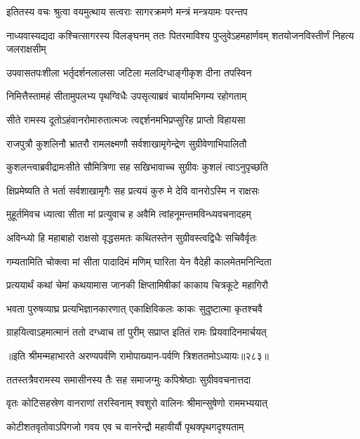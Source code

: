 \twolineshloka
{इतितस्य वचः श्रुत्वा वयमुत्थाय सत्वराः}
{सागरक्रमणे मन्त्रं मन्त्रयामः परन्तप}


\threelineshloka
{नाध्यवास्यद्यदा कश्चित्सागरस्य विलङ्घनम्}
{ततः पितरमाविश्य पुप्लुवेऽहमहार्णवम्}
{शतयोजनविस्तीर्णं निहत्य जलराक्षसीम्}


\twolineshloka
{उपवासतपःशीला भर्तृदर्शनलालसा}
{जटिला मलदिग्धाङ्गीकृश दीना तपस्विन}


\twolineshloka
{निमित्तैस्तामहं सीतामुपलभ्य पृथग्विधैः}
{उपसृत्याब्रवं चार्यामभिगम्य रहोगताम्}


\twolineshloka
{सीते रामस्य दूतोऽहंवानरोमारुतात्मजः}
{त्वद्दर्शनमभिप्रप्सुरिह प्राप्तो विहायसा}


\twolineshloka
{राजपुत्रौ कुशलिनौ भ्रातरौ रामलक्ष्मणौ}
{सर्वशाखामृगेन्द्रेण सुग्रीवेणाभिपालितौ}


\twolineshloka
{कुशलन्त्वाब्रवीद्रामःसीते सौमित्रिणा सह}
{सखिभावाच्च सुग्रीवः कुशलं त्वाऽनुपृच्छति}


\twolineshloka
{क्षिप्रमेष्यति ते भर्ता सर्वशाखामृगैः सह}
{प्रत्ययं कुरु मे देवि वानरोऽस्मि न राक्षसः}


\twolineshloka
{मुहूर्तमिवच ध्यात्वा सीता मां प्रत्युवाच ह}
{अवैमि त्वांहनूमन्तमविन्ध्यवचनादहम्}


\twolineshloka
{अविन्ध्यो हि महाबाहो राक्षसो वृद्धसमतः}
{कथितस्तेन सुग्रीवस्त्वद्विधैः सचिवैर्वृतः}


\twolineshloka
{गम्यतामिति चोक्त्वा मां सीता पादादिमं मणिम्}
{घारिता येन वैदेही कालमेतमनिन्दिता}


\twolineshloka
{प्रत्ययार्थं कथां चेमां कथयामास जानकी}
{क्षिप्तामिषीकां काकाय चित्रकूटे महागिरौ}


\twolineshloka
{भवता पुरुषव्याघ्र प्रत्यभिज्ञानकारणात्}
{एकाक्षिविकलः काकः सुदुष्टात्मा कृतश्चवै}


\twolineshloka
{ग्राहयित्वाऽहमात्मानं ततो दग्ध्वाच तां पुरीम्}
{सप्राप्त इतितं रामः प्रियवादिनमार्चयत्}


॥इति श्रीमन्महाभारते अरण्यपर्वणि रामोपाख्यान-पर्वणि त्रिशततमोऽध्यायः॥२८३॥




\twolineshloka
{ततस्तत्रैवरामस्य समासीनस्य तैः सह}
{समाजग्मुः कपिश्रेष्ठाः सुग्रीववचनात्तदा}


\twolineshloka
{वृतः कोटिसहस्रेण वानराणां तरस्विनाम्}
{श्वशुरो वालिनः श्रीमान्सुषेणो राममभ्ययात्}


\twolineshloka
{कोटीशतवृतोवाऽपिगजो गवय एव च}
{वानरेन्द्रौ महावीर्यौ पृथक्पृथगदृश्यताम्}


